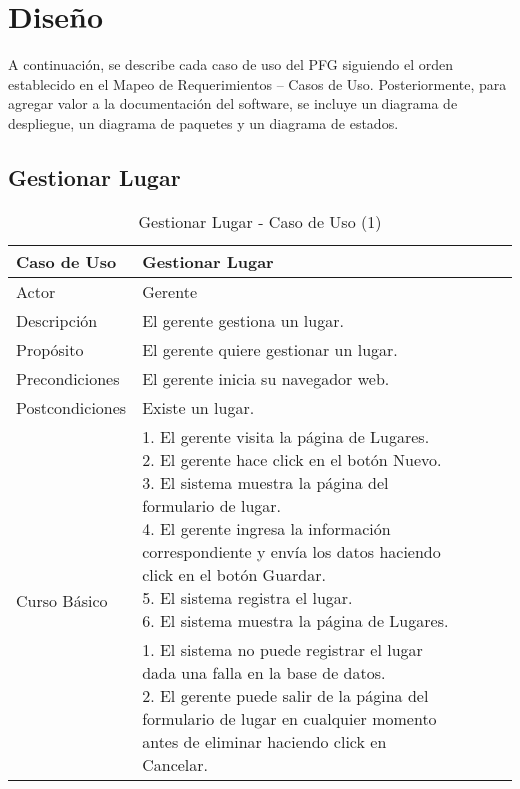 

\chapter{Diseño}
A continuación, se describe cada caso de uso del PFG siguiendo el orden establecido en el Mapeo de Requerimientos – Casos de Uso. Posteriormente, para agregar valor a la documentación del software, se incluye un diagrama de despliegue, un diagrama de paquetes y un diagrama de estados.  
\section{Gestionar Lugar}

\begin{table}[H]
    \begin{tabular}{@{} *5l @{}} \toprule
    \textbf{Caso de Uso} & Gestionar Lugar \\ \midrule
    Actor & Gerente \\ 
    Descripción & El gerente gestiona un lugar. \\ 
    Propósito & El gerente quiere gestionar un lugar. \\ \midrule
    Precondiciones & El gerente inicia su navegador web. \\ \midrule
    Postcondiciones & Existe un lugar. \\ \midrule
    \multirow{4}{*}{Curso Básico}
        & \parbox{0.75\linewidth}{ 
                1. El gerente visita la página de Lugares. \\
                2. El gerente hace click en el botón Nuevo. \\
                3. El sistema muestra la página del formulario de lugar. \\
                4. El gerente ingresa la información correspondiente y envía los datos haciendo click en el botón Guardar. \\
                5. El sistema registra el lugar.  \\
                6. El sistema muestra la página de Lugares.   
        } \\ \midrule
        & \parbox{0.75\linewidth}{ 
            1. El sistema no puede registrar el lugar dada una falla en la base de datos. \\
            2. El gerente puede salir de la página del formulario de lugar en cualquier momento antes de eliminar haciendo click en Cancelar.
        }  \\  \bottomrule
     \hline
    \end{tabular}
        \caption{Gestionar Lugar - Caso de Uso (1)}
        \label{tab:tabcu-lugar}
\end{table}


